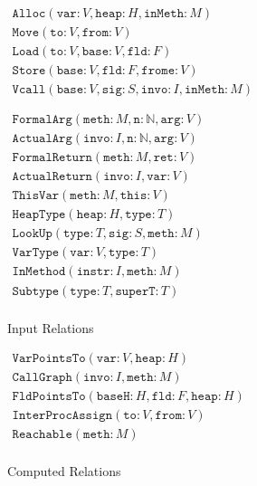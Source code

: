 \begin{figure}

  \begin{math}
    \begin{array}{l}
      \mathtt{Alloc}(\mathtt{var}: V, \mathtt{heap}: H, \mathtt{inMeth}: M) \\
      \mathtt{Move}(\mathtt{to}: V, \mathtt{from}: V) \\
      \mathtt{Load}(\mathtt{to}: V, \mathtt{base}: V, \mathtt{fld}: F) \\
      \mathtt{Store}(\mathtt{base}: V, \mathtt{fld}: F, \mathtt{frome}: V) \\
      \mathtt{Vcall}(\mathtt{base}: V, \mathtt{sig}: S, \mathtt{invo}: I, \mathtt{inMeth}: M) \\
      \\
      \\
      \mathtt{FormalArg}(\mathtt{meth}: M, \mathtt{n}: \mathbb{N}, \mathtt{arg}: V) \\
      \mathtt{ActualArg}(\mathtt{invo}: I, \mathtt{n}: \mathbb{N}, \mathtt{arg}: V) \\
      \mathtt{FormalReturn}(\mathtt{meth}: M, \mathtt{ret}: V) \\
      \mathtt{ActualReturn}(\mathtt{invo}: I, \mathtt{var}: V) \\
      \mathtt{ThisVar}(\mathtt{meth}: M, \mathtt{this}: V) \\
      \mathtt{HeapType}(\mathtt{heap}: H, \mathtt{type}: T) \\
      \mathtt{LookUp}(\mathtt{type}: T, \mathtt{sig}: S, \mathtt{meth}: M) \\
      \mathtt{VarType}(\mathtt{var}: V, \mathtt{type}: T) \\
      \mathtt{InMethod}(\mathtt{instr}: I, \mathtt{meth}: M) \\
      \mathtt{Subtype}(\mathtt{type}: T, \mathtt{superT}: T) \\
    \end{array}
  \end{math}

  \caption{Input Relations}
  \label{fig:input-relations}
\end{figure}


\begin{figure}
  \begin{math}
    \begin{array}{l}
      \mathtt{VarPointsTo}(\mathtt{var}: V, \mathtt{heap}: H) \\
      \mathtt{CallGraph}(\mathtt{invo}: I, \mathtt{meth}: M) \\
      \mathtt{FldPointsTo}(\mathtt{baseH}: H, \mathtt{fld}: F, \mathtt{heap}: H) \\
      \mathtt{InterProcAssign}(\mathtt{to}: V, \mathtt{from}: V) \\
      \mathtt{Reachable}(\mathtt{meth}: M) \\
    \end{array}
  \end{math}

  \caption{Computed Relations}
  \label{fig:computed-relations}
\end{figure}


